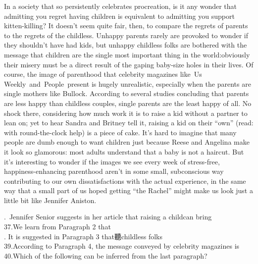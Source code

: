 In a society that so persistently celebrates procreation, is it any wonder that admitting you regret having children is equivalent to admitting you support kitten-killing? It doesn’t seem quite fair, then, to compare the regrets of parents to the regrets of the childless. Unhappy parents rarely are provoked to wonder if they shouldn’t have had kids, but unhappy childless folks are bothered with the message that children are the single most important thing in the world:obviously their misery must be a direct result of the gaping baby-size holes in their lives.
 Of course, the image of parenthood that celebrity magazines like Us Weekly and People present is hugely unrealistic, especially when the parents are single mothers like Bullock. According to several studies concluding that parents are less happy than childless couples, single parents are the least happy of all. No shock there, considering how much work it is to raise a kid without a partner to lean on; yet to hear Sandra and Britney tell it, raising a kid on their “own” (read: with round-the-clock help) is a piece of cake.
 It’s hard to imagine that many people are dumb enough to want children just because Reese and Angelina make it look so glamorous: most adults understand that a baby is not a haircut. But it’s interesting to wonder if the images we see every week of stress-free, happiness-enhancing parenthood aren’t in some small, subconscious way contributing to our own dissatisfactions with the actual experience, in the same way that a small part of us hoped getting “the Rachel” might make us look just a little bit like Jennifer Aniston.
 \begin{questions} . Jennifer Senior suggests in her article that raising a childcan bring
 \\ \question 37.We learn from Paragraph 2 that
 \\ . It is suggested in Paragraph 3 that聽childless folks
 \\ \question 39.According to Paragraph 4, the message conveyed by celebrity magazines is
 \\ \question 40.Which of the following can be inferred from the last paragraph?
 \\ \end{questions}    
 